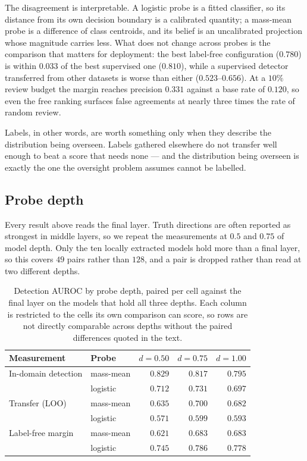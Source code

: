 The disagreement is interpretable. A logistic probe is a fitted classifier, so
its distance from its own decision boundary is a calibrated quantity; a
mass-mean probe is a difference of class centroids, and its belief is an
uncalibrated projection whose magnitude carries less. What does not change
across probes is the comparison that matters for deployment: the best label-free
configuration ($0.780$) is within $0.033$ of the best supervised one ($0.810$),
while a supervised detector transferred from other datasets is worse than either
($0.523$--$0.656$). At a $10\%$ review budget the margin reaches precision
$0.331$ against a base rate of $0.120$, so even the free ranking surfaces false
agreements at nearly three times the rate of random review.

Labels, in other words, are worth something only when they describe the
distribution being overseen. Labels gathered elsewhere do not transfer well
enough to beat a score that needs none --- and the distribution being overseen
is exactly the one the oversight problem assumes cannot be labelled.

\subsection{Probe depth}
\label{sec:results:depth}

Every result above reads the final layer. Truth directions are often reported as
strongest in middle layers, so we repeat the measurements at $0.5$ and $0.75$ of
model depth. Only the ten locally extracted models hold more than a final layer,
so this covers $49$ pairs rather than $128$, and a pair is dropped rather than
read at two different depths.

\begin{table}[h]
\centering
\small
\begin{tabular}{llrrr}
\toprule
Measurement & Probe & $d=0.50$ & $d=0.75$ & $d=1.00$ \\
\midrule
In-domain detection & mass-mean & $0.829$ & $0.817$ & $0.795$ \\
                    & logistic  & $0.712$ & $0.731$ & $0.697$ \\
\addlinespace
Transfer (LOO)      & mass-mean & $0.635$ & $0.700$ & $0.682$ \\
                    & logistic  & $0.571$ & $0.599$ & $0.593$ \\
\addlinespace
Label-free margin   & mass-mean & $0.621$ & $0.683$ & $0.683$ \\
                    & logistic  & $0.745$ & $0.786$ & $0.778$ \\
\bottomrule
\end{tabular}
\caption{Detection AUROC by probe depth, paired per cell against the final
layer on the models that hold all three depths. Each column is restricted to the
cells its own comparison can score, so rows are not directly comparable across
depths without the paired differences quoted in the text.}
\label{tab:depth}
\end{table}

